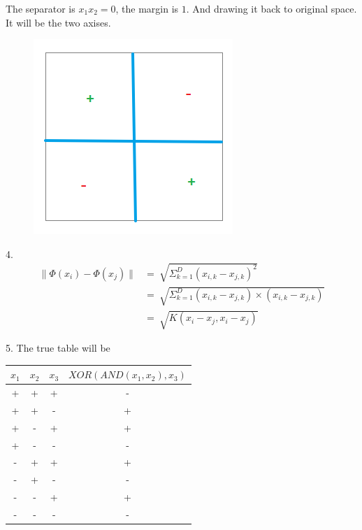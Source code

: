 \documentclass{article}
\begin{document}
\begin{tlist}{3}
	The separator is $x_1x_2=0$, the margin is $1$. And drawing it back to original space. It will be the two axises.
	\begin{figure}[H]\centering\includegraphics{3-2.png}\end{figure}
	\item[4.]
	\begin{align*}
		\|\Phi(x_i)-\Phi(x_j)\| & =\ \sqrt{\Sigma_{k=1}^D(x_{i,k}-x_{j,k})^2}                      \\
		                        & =\ \sqrt{\Sigma_{k=1}^D(x_{i,k}-x_{j,k})\times(x_{i,k}-x_{j,k})} \\
		                        & =\ \sqrt{K(x_i-x_j,x_i-x_j)}
	\end{align*}
	\item[5.]
	The true table will be
	\begin{center}
		\begin{tabular}{|c|c|c|c|}
			\hline
			\rowcolor[HTML]{C0C0C0}
			$x_1$ & $x_2$ & $x_3$ & $XOR(AND(x_1,x_2),x_3)$ \\ \hline
			+     & +     & +     & -                       \\ \hline
			+     & +     & -     & +                       \\ \hline
			+     & -     & +     & +                       \\ \hline
			+     & -     & -     & -                       \\ \hline
			-     & +     & +     & +                       \\ \hline
			-     & +     & -     & -                       \\ \hline
			-     & -     & +     & +                       \\ \hline
			-     & -     & -     & -                       \\ \hline

\end{tabular}
\end{center}
\end{tlist}
\end{document}
